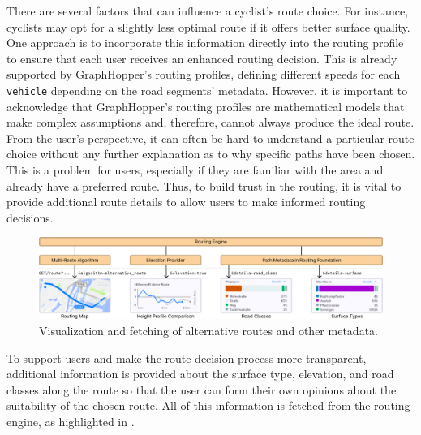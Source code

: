 There are several factors that can influence a cyclist's route choice. For instance, cyclists may opt for a slightly less optimal route if it offers better surface quality. One approach is to incorporate this information directly into the routing profile to ensure that each user receives an enhanced routing decision. This is already supported by GraphHopper's routing profiles, defining different speeds for each \texttt{vehicle} depending on the road segments' metadata. However, it is important to acknowledge that GraphHopper's routing profiles are mathematical models that make complex assumptions and, therefore, cannot always produce the ideal route. From the user's perspective, it can often be hard to understand a particular route choice without any further explanation as to why specific paths have been chosen. This is a problem for users, especially if they are familiar with the area and already have a preferred route. Thus, to build trust in the routing, it is vital to provide additional route details to allow users to make informed routing decisions.

\begin{figure}[htbp]
\centering
\includegraphics[width=\linewidth]{images/graphhopper-data-flow.png}
\caption{Visualization and fetching of alternative routes and other metadata.}
\label{fig:graphhopper-data-flow}
\end{figure}

To support users and make the route decision process more transparent, additional information is provided about the surface type, elevation, and road classes along the route so that the user can form their own opinions about the suitability of the chosen route. All of this information is fetched from the routing engine, as highlighted in .

